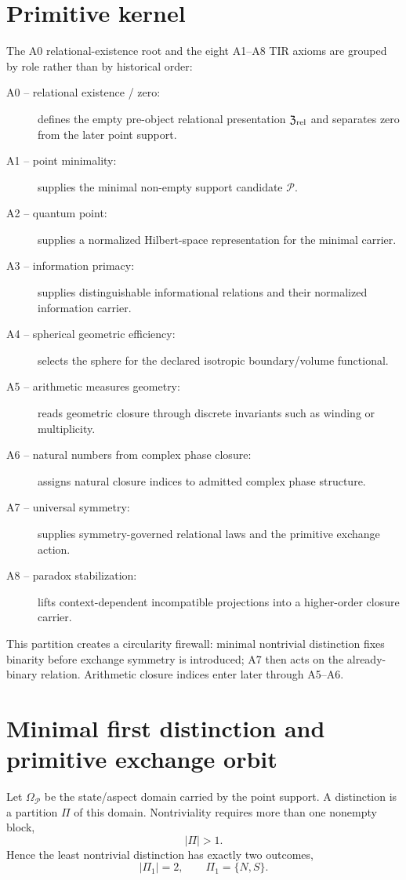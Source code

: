 \section{Primitive kernel}

The A0 relational-existence root and the eight A1--A8 TIR axioms are grouped by role rather than by historical order:
\begin{description}
\item[A0 -- relational existence / zero:] defines the empty pre-object relational presentation $\mathfrak Z_{\rm rel}$ and separates zero from the later point support.
\item[A1 -- point minimality:] supplies the minimal non-empty support candidate $\mathcal P$.
\item[A2 -- quantum point:] supplies a normalized Hilbert-space representation for the minimal carrier.
\item[A3 -- information primacy:] supplies distinguishable informational relations and their normalized information carrier.
\item[A4 -- spherical geometric efficiency:] selects the sphere for the declared isotropic boundary/volume functional.
\item[A5 -- arithmetic measures geometry:] reads geometric closure through discrete invariants such as winding or multiplicity.
\item[A6 -- natural numbers from complex phase closure:] assigns natural closure indices to admitted complex phase structure.
\item[A7 -- universal symmetry:] supplies symmetry-governed relational laws and the primitive exchange action.
\item[A8 -- paradox stabilization:] lifts context-dependent incompatible projections into a higher-order closure carrier.
\end{description}

This partition creates a circularity firewall: minimal nontrivial distinction fixes binarity before exchange symmetry is introduced; A7 then acts on the already-binary relation. Arithmetic closure indices enter later through A5--A6.

\section{Minimal first distinction and primitive exchange orbit}

Let $\Omega_{\mathcal P}$ be the state/aspect domain carried by the point support. A distinction is a partition $\Pi$ of this domain. Nontriviality requires more than one nonempty block,
\begin{equation}
|\Pi|>1.
\end{equation}
Hence the least nontrivial distinction has exactly two outcomes,
\begin{equation}
\boxed{
|\Pi_1|=2,
\qquad
\Pi_1=\{N,S\}.
}
\label{eq:v12_minimal_binary_partition}
\end{equation}

